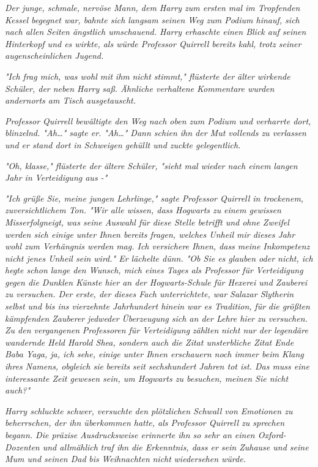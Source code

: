 {\emph{Der junge, schmale, nervöse Mann, dem Harry zum ersten mal im Tropfenden Kessel begegnet war, bahnte sich langsam seinen Weg zum Podium hinauf, sich nach allen Seiten ängstlich umschauend. Harry erhaschte einen Blick auf seinen Hinterkopf und es wirkte, als würde Professor Quirrell bereits kahl, trotz seiner augenscheinlichen Jugend.}

\emph{"Ich frag mich, was wohl mit} \emph{\emph{ihm}} \emph{nicht stimmt," flüsterte der älter wirkende Schüler, der neben Harry saß. Ähnliche verhaltene Kommentare wurden andernorts am Tisch ausgetauscht.}

\emph{Professor Quirrell bewältigte den Weg nach oben zum Podium und verharrte dort, blinzelnd. "Ah…" sagte er. "Ah…" Dann schien ihn der Mut vollends zu verlassen und er stand dort in Schweigen gehüllt und zuckte gelegentlich.}

\emph{"Oh, klasse," flüsterte der ältere Schüler, "sieht mal wieder nach einem} \emph{\emph{langen}} \emph{Jahr in} \emph{Verteidigung aus -"}

\emph{"Ich grüße Sie, meine jungen Lehrlinge," sagte Professor Quirrell in trockenem, zuversichtlichem Ton. "Wir alle wissen, dass Hogwarts zu} \emph{einem gewissen} \emph{\emph{Misserfolg}neigt,} \emph{was seine Auswahl für diese Stelle betrifft und ohne Zweifel werden sich einige unter Ihnen bereits fragen, welches Unheil mir dieses Jahr wohl zum Verhängnis werden} \emph{mag. Ich versichere Ihnen, dass meine Inkompetenz nicht jenes Unheil sein wird." Er lächelte dünn. "Ob Sie es glauben oder nicht, ich hegte schon lange den Wunsch, mich eines Tages als Professor für Verteidigung gegen die Dunklen Künste hier an der Hogwarts-Schule für Hexerei und Zauberei zu versuchen. Der erste, der dieses Fach unterrichtete, war Salazar Slytherin selbst und bis ins vierzehnte Jahrhundert hinein war es Tradition,} \emph{für} \emph{die größten kämpfenden Zauberer} \emph{jedweder} \emph{Überzeugung sich an der Lehre hier} \emph{zu} \emph{versuchen.} \emph{Zu den vergangenen} \emph{Professoren für Verteidigung} \emph{zählten} \emph{nicht nur der} \emph{legendäre wandernde Held Harold Shea, sondern auch die Zitat unsterbliche Zitat Ende Baba Yaga, ja, ich sehe, einige unter Ihnen erschauern noch immer beim Klang ihres Namens, obgleich sie} \emph{bereits} \emph{seit sechshundert Jahren tot ist. Das muss eine interessante Zeit gewesen sein, um Hogwarts zu besuchen, meinen Sie nicht auch?"}

\emph{Harry schluckte schwer, versuchte den plötzlichen Schwall von Emotionen zu beherrschen, der ihn überkommen hatte, als Professor Quirrell zu sprechen begann. Die präzise Ausdrucksweise erinnerte ihn so sehr an einen Oxford-Dozenten und allmählich} \emph{traf ihn} \emph{die Erkenntnis, dass er sein Zuhause und seine Mum und seinen Dad} \emph{bis} \emph{Weihnachten} \emph{nicht} \emph{wiedersehen würde.}

}
